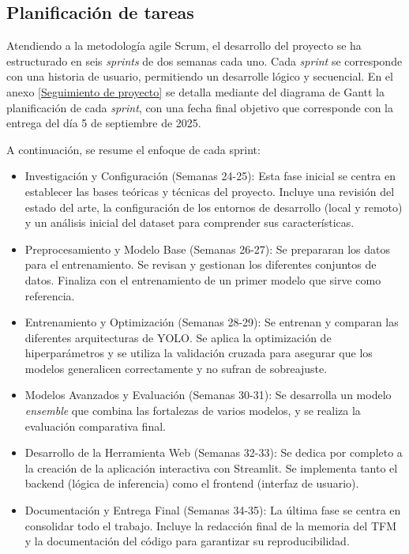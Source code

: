 \documentclass[12pt,a4paper,onecolumn,oneside]{report}
\begin{document}
\subsection{Planificación de tareas}
\label{Planificación de tareas}

Atendiendo a la metodología agile Scrum, el desarrollo del proyecto se ha estructurado en seis \textit{sprints} de dos semanas cada uno.
Cada \textit{sprint} se corresponde con una historia de usuario, permitiendo un desarrolle lógico y secuencial.
En el anexo \ref{Seguimiento de proyecto} se detalla mediante del diagrama de Gantt \cite{OnlineGantt2025} la planificación de cada \textit{sprint}, con una fecha final objetivo que corresponde con la entrega del día 5 de septiembre de 2025.

A continuación, se resume el enfoque de cada sprint:

\begin{itemize}[label=-]
  \item Investigación y Configuración (Semanas 24-25): Esta fase inicial se centra en establecer las bases teóricas y técnicas del proyecto. Incluye una revisión del estado del arte, la configuración de los entornos de desarrollo (local y remoto) y un análisis inicial del dataset para comprender sus características.
  
  \item Preprocesamiento y Modelo Base (Semanas 26-27): Se prepararan los datos para el entrenamiento. Se revisan y gestionan los diferentes conjuntos de datos. Finaliza con el entrenamiento de un primer modelo que sirve como referencia.
  
  \item Entrenamiento y Optimización (Semanas 28-29): Se entrenan y comparan las diferentes arquitecturas de YOLO. Se aplica la optimización de hiperparámetros y se utiliza la validación cruzada para asegurar que los modelos generalicen correctamente y no sufran de sobreajuste.
  
  \item Modelos Avanzados y Evaluación (Semanas 30-31): Se desarrolla un modelo \textit{ensemble} que combina las fortalezas de varios modelos, y se realiza la evaluación comparativa final.
  
  \item Desarrollo de la Herramienta Web (Semanas 32-33): Se dedica por completo a la creación de la aplicación interactiva con Streamlit. Se implementa tanto el backend (lógica de inferencia) como el frontend (interfaz de usuario).
  
  \item Documentación y Entrega Final (Semanas 34-35): La última fase se centra en consolidar todo el trabajo. Incluye la redacción final de la memoria del TFM y la documentación del código para garantizar su reproducibilidad.
\end{itemize}
\end{document}
